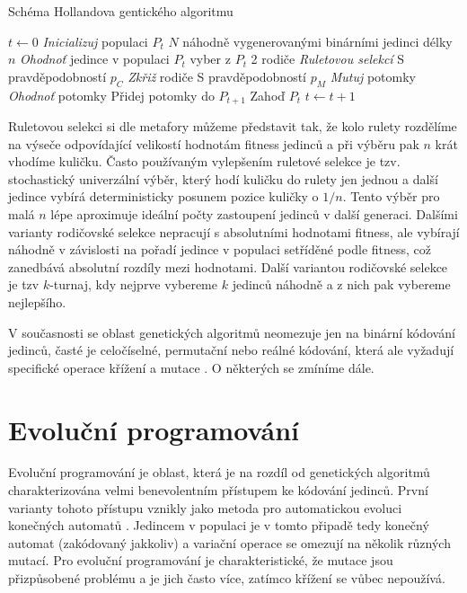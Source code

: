\documentclass[12pt,fleqn,a4paper,proc]{article}
\begin{document}
\begin{algorithm}
\caption{Schéma Hollandova gentického algoritmu}
\label{obrga}
\begin{algorithmic}
\State $t \gets 0$
\State \emph{Inicializuj} populaci $P_t$ $N$ náhodně vygenerovanými binárními jedinci délky $n$
\State \emph{Ohodnoť} jedince v populaci $P_t$
\State 	vyber z $P_t$ 2 rodiče \emph{Ruletovou selekcí}
\State 	S pravděpodobností $p_C$ \emph{Zkřiž} rodiče
\State 	S pravděpodobností $p_M$ \emph{Mutuj} potomky
\State 	\emph{Ohodnoť} potomky
\State  Přidej potomky do $P_{t+1}$
\EndFor
\State 	Zahoď $P_t$
\State $t \gets t+1$
\EndWhile
\EndProcedure
\end{algorithmic}
\end{algorithm}

Ruletovou selekci si dle metafory můžeme představit tak, že kolo rulety rozdělíme na výseče odpovídající velikostí hodnotám fitness jedinců a při výběru pak $n$ krát vhodíme kuličku. Často používaným vylepšením ruletové selekce je tzv. stochastický univerzální výběr, který hodí kuličku do rulety jen jednou a další jedince vybírá deterministicky posunem pozice kuličky o $1/n$. Tento výběr pro malá $n$ lépe aproximuje ideální počty zastoupení jedinců v další generaci. Dalšími varianty rodičovské selekce nepracují s absolutními hodnotami fitness, ale vybírají náhodně v závislosti na pořadí jedince v populaci setříděné podle fitness, což zanedbává absolutní rozdíly mezi hodnotami. Další variantou rodičovské selekce je tzv $k$-turnaj, kdy nejprve vybereme $k$ jedinců náhodně a z nich pak vybereme nejlepšího. 

V současnosti se oblast genetických algoritmů neomezuje jen na binární kódování jedinců, časté je celočíselné, permutační nebo reálné kódování, která ale vyžadují specifické operace křížení a mutace \cite{michal, mitchel}. O některých se zmíníme dále. 


\section{Evoluční programování}

Evoluční programování je oblast, která je na rozdíl od genetických algoritmů charakterizována velmi benevolentním přístupem ke kódování jedinců. První varianty tohoto přístupu vznikly jako metoda pro automatickou evoluci konečných automatů \cite{fogel}. Jedincem v populaci je v tomto připadě tedy konečný automat (zakódovaný jakkoliv) a variační operace se omezují na několik různých mutací. Pro evoluční programování je charakteristické, že mutace jsou přizpůsobené problému a je jich často více, zatímco křížení se vůbec nepoužívá. 
\end{document}
